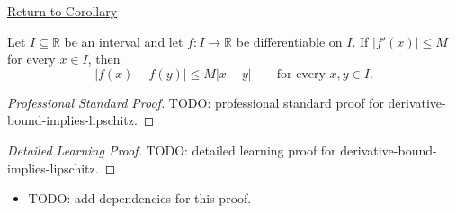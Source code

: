 \newpage
{}
\label{prf:derivative-bound-implies-lipschitz}

\begin{remark*}[Return]
\hyperref[cor:derivative-bound-implies-lipschitz]{Return to Corollary}
\end{remark*}

\begin{corollary*}
Let \(I\subseteq\mathbb{R}\) be an interval and let \(f:I\to\mathbb{R}\) be differentiable on \(I\). If \(|f'(x)|\leq M\) for every \(x\in I\), then
\[
  |f(x)-f(y)|\leq M|x-y|
  \qquad\text{for every }x,y\in I.
\]
\end{corollary*}

\begin{proof}[Professional Standard Proof]
\LRAProofBodyStart
TODO: professional standard proof for derivative-bound-implies-lipschitz.
\end{proof}

\begin{proof}[Detailed Learning Proof]
\LRAProofBodyStart
TODO: detailed learning proof for derivative-bound-implies-lipschitz.
\end{proof}

\begin{remark*}
\end{remark*}

\begin{dependencies}
\begin{itemize}
  \item TODO: add dependencies for this proof.
\end{itemize}
\end{dependencies}

\clearpage
